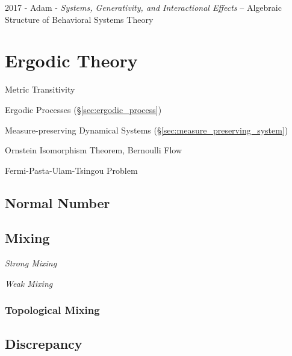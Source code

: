2017 - Adam - \emph{Systems, Generativity, and Interactional Effects}
-- Algebraic Structure of Behavioral Systems Theory



\section{Ergodic Theory}\label{sec:ergodic_theory}

Metric Transitivity

\fist Ergodic Processes (\S\ref{sec:ergodic_process})

\fist Measure-preserving Dynamical Systems
(\S\ref{sec:measure_preserving_system})

Ornstein Isomorphism Theorem, Bernoulli Flow

Fermi-Pasta-Ulam-Tsingou Problem



\subsection{Normal Number}\label{sec:normal_number}

\subsection{Mixing}\label{sec:mixing}

\emph{Strong Mixing}

\emph{Weak Mixing}



\subsubsection{Topological Mixing}\label{sec:topological_mixing}



\subsection{Discrepancy}\label{sec:discrepancy}

